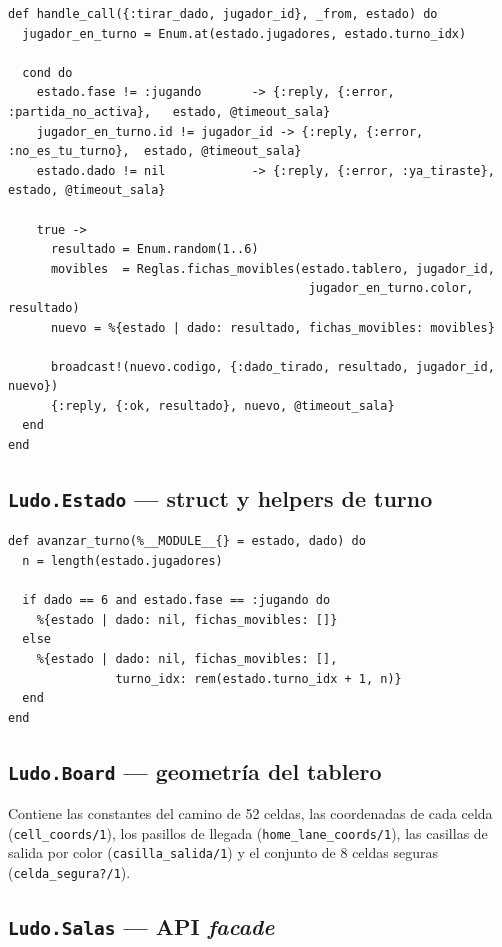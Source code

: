 \documentclass[11pt,a4paper]{article}
\begin{document}
\begin{lstlisting}[caption={Manejo de \texttt{:tirar\_dado} con validaciones}]
def handle_call({:tirar_dado, jugador_id}, _from, estado) do
  jugador_en_turno = Enum.at(estado.jugadores, estado.turno_idx)

  cond do
    estado.fase != :jugando       -> {:reply, {:error, :partida_no_activa},   estado, @timeout_sala}
    jugador_en_turno.id != jugador_id -> {:reply, {:error, :no_es_tu_turno},  estado, @timeout_sala}
    estado.dado != nil            -> {:reply, {:error, :ya_tiraste},          estado, @timeout_sala}

    true ->
      resultado = Enum.random(1..6)
      movibles  = Reglas.fichas_movibles(estado.tablero, jugador_id,
                                          jugador_en_turno.color, resultado)
      nuevo = %{estado | dado: resultado, fichas_movibles: movibles}

      broadcast!(nuevo.codigo, {:dado_tirado, resultado, jugador_id, nuevo})
      {:reply, {:ok, resultado}, nuevo, @timeout_sala}
  end
end
\end{lstlisting}

\subsection{\texttt{Ludo.Estado} --- struct y helpers de turno}

\begin{lstlisting}[caption={Helpers de avance de turno}]
def avanzar_turno(%__MODULE__{} = estado, dado) do
  n = length(estado.jugadores)

  if dado == 6 and estado.fase == :jugando do
    %{estado | dado: nil, fichas_movibles: []}
  else
    %{estado | dado: nil, fichas_movibles: [],
               turno_idx: rem(estado.turno_idx + 1, n)}
  end
end
\end{lstlisting}

\subsection{\texttt{Ludo.Board} --- geometría del tablero}

Contiene las constantes del camino de 52 celdas, las coordenadas de cada celda (\texttt{cell\_coords/1}), los pasillos de llegada (\texttt{home\_lane\_coords/1}), las casillas de salida por color (\texttt{casilla\_salida/1}) y el conjunto de 8 celdas seguras (\texttt{celda\_segura?/1}).

\subsection{\texttt{Ludo.Salas} --- API \textit{facade}}
\end{document}
